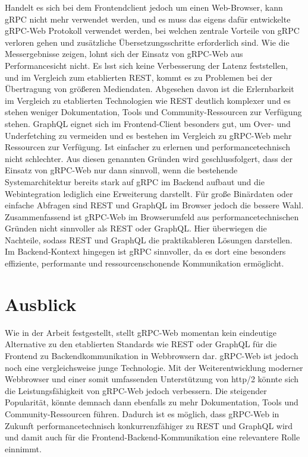 Handelt es sich bei dem Frontendclient jedoch um einen Web-Browser, kann gRPC nicht mehr verwendet werden, und es muss das eigens dafür entwickelte gRPC-Web Protokoll verwendet werden, bei welchen zentrale Vorteile von gRPC verloren gehen und zusätzliche Übersetzungsschritte erforderlich sind. Wie die Messergebnisse zeigen, lohnt sich der Einsatz von gRPC-Web aus Performancesicht nicht. Es lsst sich keine Verbesserung der Latenz feststellen, und im Vergleich zum etablierten REST, kommt es zu Problemen bei der Übertragung von größeren Mediendaten. Abgesehen davon ist die Erlernbarkeit im Vergleich zu etablierten Technologien wie REST deutlich komplexer und es stehen weniger Dokumentation, Tools und Community-Ressourcen zur Verfügung stehen. GraphQL eignet sich im Frontend-Client besonders gut, um Over- und Underfetching zu vermeiden und es bestehen im Vergleich zu gRPC-Web mehr Ressourcen zur Verfügung. Ist einfacher zu erlernen und performancetechnisch nicht schlechter. 
Aus diesen genannten Gründen wird geschlussfolgert, dass der Einsatz von gRPC-Web nur dann sinnvoll, wenn die bestehende Systemarchitektur bereits stark auf gRPC im Backend aufbaut und die Webintegration lediglich eine Erweiterung darstellt. Für große Binärdaten oder einfache Abfragen sind REST und GraphQL im Browser jedoch die bessere Wahl.
Zusammenfassend ist gRPC-Web im Browserumfeld aus performancetechnischen Gründen nicht sinnvoller als REST oder GraphQL. Hier überwiegen die Nachteile, sodass REST und GraphQL die praktikableren Lösungen darstellen. Im Backend-Kontext hingegen ist gRPC sinnvoller, da es dort eine besonders effiziente, performante und ressourcenschonende Kommunikation ermöglicht.


\section{Ausblick}
Wie in der Arbeit festgestellt, stellt gRPC-Web momentan kein eindeutige Alternative zu den etablierten Standards wie REST oder GraphQL für die Frontend zu Backendkommunikation in Webbrowsern dar. gRPC-Web ist jedoch noch eine vergleichsweise junge Technologie. Mit der Weiterentwicklung moderner Webbrowser und einer somit umfassenden Unterstützung von http/2 könnte sich die Leistungsfähigkeit von gRPC-Web jedoch verbessern. Die steigender Popularität, könnte demnach dann ebenfalls zu mehr Dokumentation, Tools und Community-Ressourcen führen. Dadurch ist es möglich, dass gRPC-Web in Zukunft performancetechnisch konkurrenzfähiger zu REST und GraphQL wird und damit auch für die Frontend-Backend-Kommunikation eine relevantere Rolle einnimmt.
\chapterend
